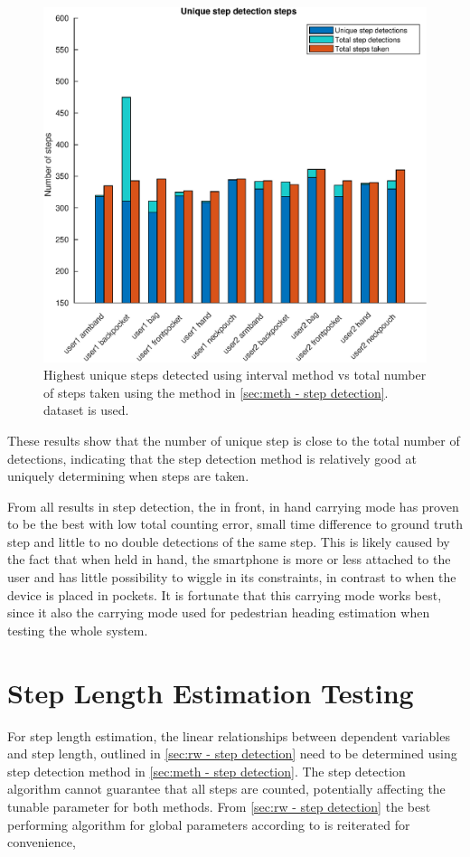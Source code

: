 \begin{figure}[H]
	\centering
	\includegraphics[width=0.7\linewidth]{images/20201127_1626_Unique_step_detection_steps}
	\setlength{\belowcaptionskip}{-10pt}
\caption[False positives and true positives step detection comparison]{Highest unique steps detected using interval method vs total number of steps taken using the method in \cref{sec:meth - step detection}. \citet{Brajdic2013} dataset is used. }
\label{fig:sd_tp_fp_comparison}
\end{figure}

These results show that the number of unique step is close to the total number of detections, indicating that the step detection method is relatively good at uniquely determining when steps are taken. \par 

From all results in step detection, the in front, in hand carrying mode has proven to be the best with low total counting error, small time difference to ground truth step and little to no double detections of the same step. This is likely caused by the fact that when held in hand, the smartphone is more or less attached to the user and has little possibility to wiggle in its constraints, in contrast to when the device is placed in pockets. It is fortunate that this carrying mode works best, since it also the carrying mode used for pedestrian heading estimation when testing the whole system.

\section{Step Length Estimation Testing}
\label{sec:results-step_length_estimation}
For step length estimation, the linear relationships between dependent variables and step length, outlined in \cref{sec:rw - step detection} need to be determined using step detection method in \cref{sec:meth - step detection}. The step detection algorithm cannot guarantee that all steps are counted, potentially affecting the tunable parameter for both methods.  From \cref{sec:rw - step detection} the best performing algorithm for global parameters according to \cite{Vezocnik2019} is reiterated for convenience,

